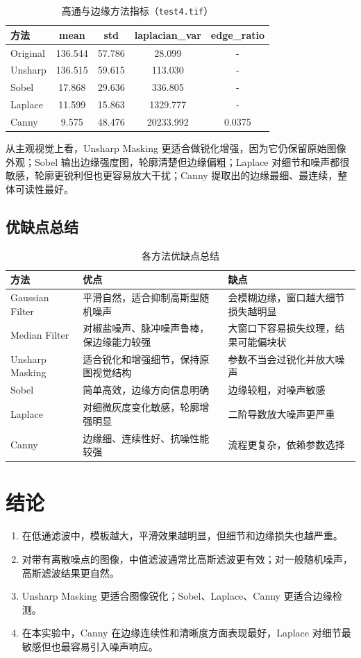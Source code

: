 \documentclass[UTF8,a4paper,12pt]{ctexart}
\begin{document}
\begin{table}[H]
\centering
\caption{高通与边缘方法指标（\texttt{test4.tif}）}
\begin{tabular}{lcccc}
\toprule
方法 & mean & std & laplacian\_var & edge\_ratio \\
\midrule
Original & 136.544 & 57.786 & 28.099 & - \\
Unsharp & 136.515 & 59.615 & 113.030 & - \\
Sobel & 17.868 & 29.636 & 336.805 & - \\
Laplace & 11.599 & 15.863 & 1329.777 & - \\
Canny & 9.575 & 48.476 & 20233.992 & 0.0375 \\
\bottomrule
\end{tabular}
\end{table}

从主观视觉上看，Unsharp Masking 更适合做锐化增强，因为它仍保留原始图像外观；Sobel 输出边缘强度图，轮廓清楚但边缘偏粗；Laplace 对细节和噪声都很敏感，轮廓更锐利但也更容易放大干扰；Canny 提取出的边缘最细、最连续，整体可读性最好。

\subsection{优缺点总结}
\begin{table}[H]
\centering
\caption{各方法优缺点总结}
\begin{tabular}{p{2.8cm}p{5.2cm}p{5.2cm}}
\toprule
方法 & 优点 & 缺点 \\
\midrule
Gaussian Filter & 平滑自然，适合抑制高斯型随机噪声 & 会模糊边缘，窗口越大细节损失越明显 \\
Median Filter & 对椒盐噪声、脉冲噪声鲁棒，保边缘能力较强 & 大窗口下容易损失纹理，结果可能偏块状 \\
Unsharp Masking & 适合锐化和增强细节，保持原图视觉结构 & 参数不当会过锐化并放大噪声 \\
Sobel & 简单高效，边缘方向信息明确 & 边缘较粗，对噪声敏感 \\
Laplace & 对细微灰度变化敏感，轮廓增强明显 & 二阶导数放大噪声更严重 \\
Canny & 边缘细、连续性好、抗噪性能较强 & 流程更复杂，依赖参数选择 \\
\bottomrule
\end{tabular}
\end{table}

\section{结论}
\begin{enumerate}
  \item 在低通滤波中，模板越大，平滑效果越明显，但细节和边缘损失也越严重。
  \item 对带有离散噪点的图像，中值滤波通常比高斯滤波更有效；对一般随机噪声，高斯滤波结果更自然。
  \item Unsharp Masking 更适合图像锐化；Sobel、Laplace、Canny 更适合边缘检测。
  \item 在本实验中，Canny 在边缘连续性和清晰度方面表现最好，Laplace 对细节最敏感但也最容易引入噪声响应。
\end{enumerate}
\end{document}
